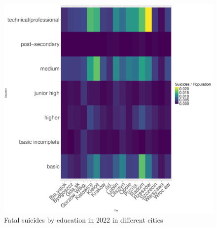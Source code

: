 \documentclass{article}
\begin{document}
\begin{figure}[H]
\begin{minipage}{0.55\textwidth}
        \includegraphics[width=\textwidth]{imgs/education_city_op-fat-2022.pdf}
        \caption{Fatal suicides by education  in 2022 in different cities}
	\label{fig:education_city_op-fat-2022}
    \end{minipage}
\end{figure}
\end{document}
